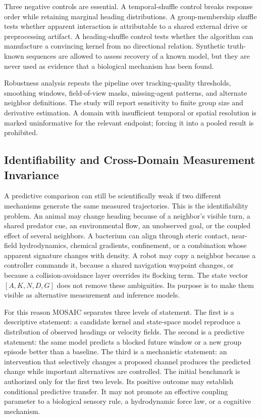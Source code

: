 \documentclass[conference]{../../../../Conference-LaTeX-template_10-17-19/IEEEtran}
\begin{document}
Three negative controls are essential. A temporal-shuffle control breaks response order while retaining marginal heading distributions. A group-membership shuffle tests whether apparent interaction is attributable to a shared external drive or preprocessing artifact. A heading-shuffle control tests whether the algorithm can manufacture a convincing kernel from no directional relation. Synthetic truth-known sequences are allowed to assess recovery of a known model, but they are never used as evidence that a biological mechanism has been found.

Robustness analysis repeats the pipeline over tracking-quality thresholds, smoothing windows, field-of-view masks, missing-agent patterns, and alternate neighbor definitions. The study will report sensitivity to finite group size and derivative estimation. A domain with insufficient temporal or spatial resolution is marked uninformative for the relevant endpoint; forcing it into a pooled result is prohibited.

\subsection{Identifiability and Cross-Domain Measurement Invariance}
A predictive comparison can still be scientifically weak if two different mechanisms generate the same measured trajectories. This is the identifiability problem. An animal may change heading because of a neighbor's visible turn, a shared predator cue, an environmental flow, an unobserved goal, or the coupled effect of several neighbors. A bacterium can align through steric contact, near-field hydrodynamics, chemical gradients, confinement, or a combination whose apparent signature changes with density. A robot may copy a neighbor because a controller commands it, because a shared navigation waypoint changes, or because a collision-avoidance layer overrides its flocking term. The state vector $[A,K,N,D,G]$ does not remove these ambiguities. Its purpose is to make them visible as alternative measurement and inference models.

For this reason MOSAIC separates three levels of statement. The first is a descriptive statement: a candidate kernel and state-space model reproduce a distribution of observed headings or velocity fields. The second is a predictive statement: the same model predicts a blocked future window or a new group episode better than a baseline. The third is a mechanistic statement: an intervention that selectively changes a proposed channel produces the predicted change while important alternatives are controlled. The initial benchmark is authorized only for the first two levels. Its positive outcome may establish conditional predictive transfer. It may not promote an effective coupling parameter to a biological sensory rule, a hydrodynamic force law, or a cognitive mechanism.
\end{document}
